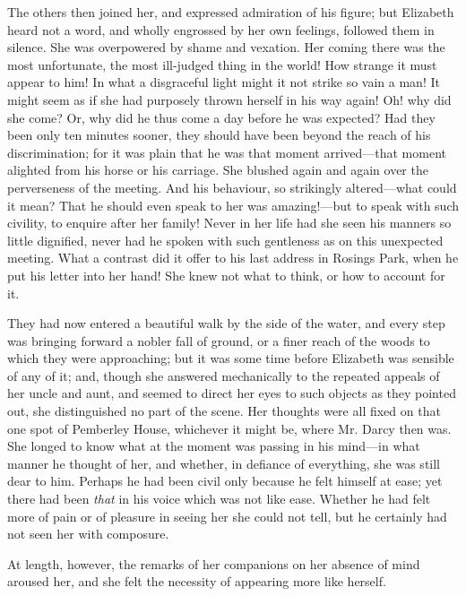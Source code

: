 The others then joined her, and expressed admiration of his figure; but Elizabeth heard not a word, and wholly engrossed by her own feelings, followed them in silence. She was overpowered by shame and vexation. Her coming there was the most unfortunate, the most ill-judged thing in the world! How strange it must appear to him! In what a disgraceful light might it not strike so vain a man! It might seem as if she had purposely thrown herself in his way again! Oh! why did she come? Or, why did he thus come a day before he was expected? Had they been only ten minutes sooner, they should have been beyond the reach of his discrimination; for it was plain that he was that moment arrived---that moment alighted from his horse or his carriage. She blushed again and again over the perverseness of the meeting. And his behaviour, so strikingly altered---what could it mean? That he should even speak to her was amazing!---but to speak with such civility, to enquire after her family! Never in her life had she seen his manners so little dignified, never had he spoken with such gentleness as on this unexpected meeting. What a contrast did it offer to his last address in Rosings Park, when he put his letter into her hand! She knew not what to think, or how to account for it.

They had now entered a beautiful walk by the side of the water, and every step was bringing forward a nobler fall of ground, or a finer reach of the woods to which they were approaching; but it was some time before Elizabeth was sensible of any of it; and, though she answered mechanically to the repeated appeals of her uncle and aunt, and seemed to direct her eyes to such objects as they pointed out, she distinguished no part of the scene. Her thoughts were all fixed on that one spot of Pemberley House, whichever it might be, where Mr. Darcy then was. She longed to know what at the moment was passing in his mind---in what manner he thought of her, and whether, in defiance of everything, she was still dear to him. Perhaps he had been civil only because he felt himself at ease; yet there had been {\em that} in his voice which was not like ease. Whether he had felt more of pain or of pleasure in seeing her she could not tell, but he certainly had not seen her with composure.

At length, however, the remarks of her companions on her absence of mind aroused her, and she felt the necessity of appearing more like herself.

